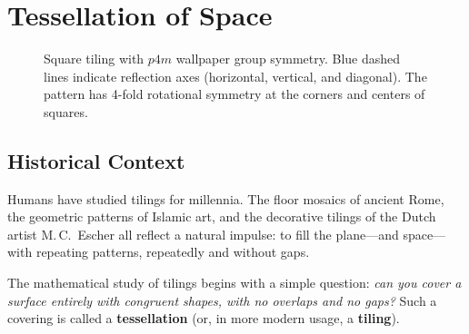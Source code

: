 
\chapter{Tessellation of Space}

\begin{figure}[htbp]
\centering
{}
\caption{Square tiling with $p4m$ wallpaper group symmetry. Blue dashed lines indicate reflection axes (horizontal, vertical, and diagonal). The pattern has 4-fold rotational symmetry at the corners and centers of squares.}
\label{fig:p4m}
\end{figure}

\section{Historical Context}

Humans have studied tilings for millennia. The floor mosaics of ancient Rome, the geometric patterns of Islamic art, and the decorative tilings of the Dutch artist M.\,C.\ Escher all reflect a natural impulse: to fill the plane---and space---with repeating patterns, repeatedly and without gaps.

The mathematical study of tilings begins with a simple question: \emph{can you cover a surface entirely with congruent shapes, with no overlaps and no gaps?} Such a covering is called a \textbf{tessellation} (or, in more modern usage, a \textbf{tiling}).

